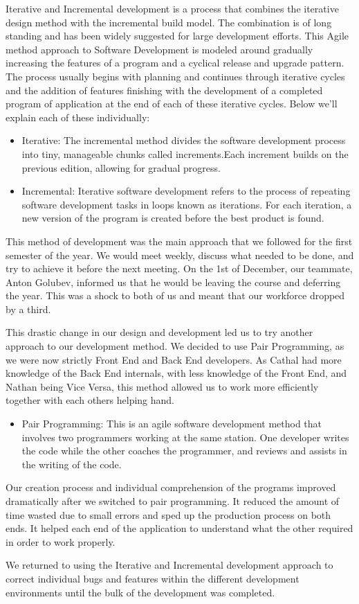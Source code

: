 \par Iterative and Incremental development is a process that combines the iterative design method with the incremental build model. The combination is of long standing  and has been widely suggested for large development efforts. This Agile method approach to Software Development is modeled around gradually increasing the features of a program and a cyclical release and upgrade pattern. The process usually begins with planning and continues through iterative cycles and the addition of features finishing with the development of a completed program of application at the end of each of these iterative cycles. Below we'll explain each of these individually:
\begin{itemize}
    \item Iterative: The incremental method divides the software development process into tiny, manageable chunks called increments.Each increment builds on the previous edition, allowing for gradual progress. 
    \item Incremental: Iterative software development refers to the process of repeating software development tasks in loops known as iterations. For each iteration, a new version of the program is created before the best product is found. 
\end{itemize}

This method of development was the main approach that we followed for the first semester of the year. We would meet weekly, discuss what needed to be done, and try to achieve it before the next meeting. On the 1st of December, our teammate, Anton Golubev, informed us that he would be leaving the course and deferring the year. This was a shock to both of us and meant that our workforce dropped by a third. \par
This drastic change in our design and development led us to try another approach to our development method. We decided to use Pair Programming, as we were now strictly Front End and Back End developers. As Cathal had more knowledge of the Back End internals, with less knowledge of the Front End, and Nathan being Vice Versa, this method allowed us to work more efficiently together with each others helping hand. \par
\begin{itemize}
    \item Pair Programming: This is an agile software development method that involves two programmers working at the same station. One developer writes the code while the other coaches the programmer, and reviews and assists in the writing of the code.
\end{itemize}
\par Our creation process and individual comprehension of the programs improved dramatically after we switched to pair programming.
It reduced the amount of time wasted due to small errors and sped up the production process on both ends. It helped each end of the application to understand what the other required in order to work properly.  \par
We returned to using the Iterative and Incremental development approach to correct individual bugs and features within the different development environments until the bulk of the development was completed. 

